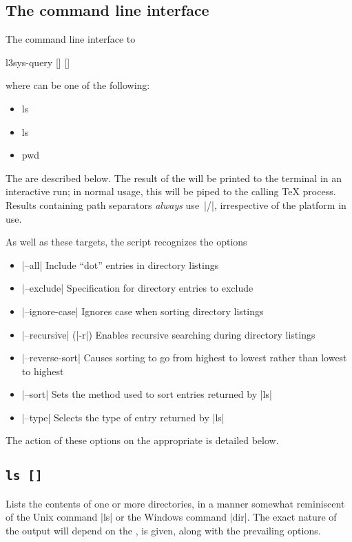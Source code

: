 \documentclass{l3doc}
\begin{document}
\begin{documentation}
\section{The command line interface}

The command line interface to 
\begin{center}
  \ttfamily
  l3sys-query  [] []
\end{center}
where \texttt{} can be one of the following:
\begin{itemize}[noitemsep]\ttfamily
  \item ls
  \item ls 
  \item pwd
\end{itemize}
The  are described below. The result of the  will be
printed to the terminal in an interactive run; in normal usage, this will be
piped to the calling \TeX{} process. Results containing path separators
\emph{always} use~|/|, irrespective of the platform in use.

As well as these targets, the script recognizes the options
\begin{itemize}
  \item |--all| Include \enquote{dot} entries in directory listings
  \item |--exclude| Specification for directory entries to exclude
  \item |--ignore-case| Ignores case when sorting directory listings
  \item |--recursive| (|-r|) Enables recursive searching during directory
    listings
  \item |--reverse-sort| Causes sorting to go from highest to lowest rather
    than lowest to highest
  \item |--sort| Sets the method used to sort entries returned by |ls|
  \item |--type| Selects the type of entry returned by |ls|
\end{itemize}
The action of these options on the appropriate  is detailed below.

\subsection{\texttt{ls []}}

Lists the contents of one or more directories, in a manner somewhat reminiscent
of the Unix command |ls| or the Windows command |dir|. The exact nature of the
output will depend on the , is given, along with the prevailing
options.


\end{documentation}
\end{document}
